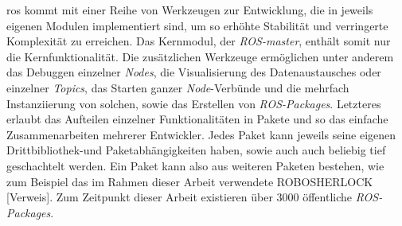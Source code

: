 \gls{ros} kommt mit einer Reihe von Werkzeugen zur Entwicklung, die in jeweils eigenen Modulen implementiert sind, um so erhöhte Stabilität und verringerte Komplexität zu erreichen. Das Kernmodul, der \textit{ROS-master}, enthält somit nur die Kernfunktionalität. Die zusätzlichen Werkzeuge ermöglichen unter anderem das Debuggen einzelner \textit{Nodes}, die Visualisierung des Datenaustausches oder einzelner \textit{Topics}, das Starten ganzer \textit{Node}-Verbünde und die mehrfach Instanziierung von solchen, sowie das Erstellen von \textit{ROS-Packages}. Letzteres erlaubt das Aufteilen einzelner Funktionalitäten in Pakete und so das einfache Zusammenarbeiten mehrerer Entwickler. Jedes Paket kann jeweils seine eigenen Drittbibliothek-und Paketabhängigkeiten haben, sowie auch auch beliebig tief geschachtelt werden. Ein Paket kann also aus weiteren Paketen bestehen, wie zum Beispiel das im Rahmen dieser Arbeit verwendete ROBOSHERLOCK [Verweis]. Zum Zeitpunkt dieser Arbeit existieren über 3000 öffentliche \textit{ROS-Packages}.   

